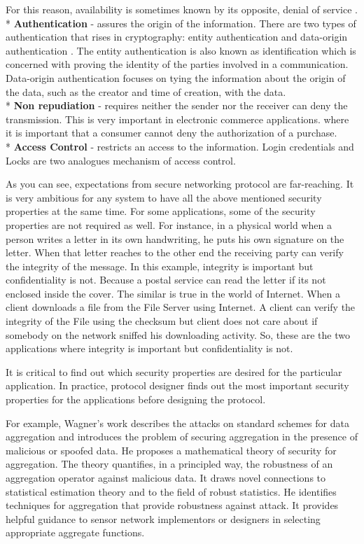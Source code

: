 	For this reason, availability is sometimes known by its opposite, denial of service \cite{pfleeger2002security}.
	\\*
	\textbf{Authentication} - assures the origin of the information.
	There are two types of authentication that rises in cryptography: entity authentication and data-origin authentication \cite{trappe2006introduction}.
	The entity authentication is also known as identification which is concerned with proving the identity of the parties involved in a communication.
	Data-origin authentication focuses on tying the information about the origin of the data, such as the creator and time of creation, with the data.\\*
	\textbf{Non repudiation} - requires neither the sender nor the receiver can deny the transmission.
	This is very important in electronic commerce applications. where it is important that a consumer cannot deny the authorization of a purchase.
	\\*
	\textbf{Access Control} - restricts an access to the information.
	Login credentials and Locks are two analogues mechanism of access control.

	As you can see, expectations from secure networking protocol are far-reaching.
	It is very ambitious for any system to have all the above mentioned security properties at the same time.
	For some applications, some of the security properties are not required as well.
	For instance, in a physical world when a person writes a letter in its own handwriting, he puts his own signature on the letter. 
	When that letter reaches to the other end the receiving party can verify the integrity of the message.
	In this example, integrity is important but confidentiality is not. Because a postal service can read the letter if its not enclosed inside the cover.
	The similar is true in the world of Internet.
	When a client downloads a file from the File Server using Internet.
	A client can verify the integrity of the File using the checksum but client does not care about if somebody on the network sniffed his downloading activity. 
	So, these are the two applications where integrity is important but confidentiality is not.
	
	It is critical to find out which security properties are desired for the particular application.
	In practice, protocol designer finds out the most important security properties for the applications before designing the protocol.

	For example, Wagner's work \cite{wagner2004resilient} describes the attacks on standard schemes for data aggregation and introduces the problem of securing aggregation in the presence of malicious or spoofed data.
	He proposes a mathematical theory of security for aggregation.
	The theory quantifies, in a principled way, the robustness of an aggregation operator against malicious data.
	It draws novel connections to statistical estimation theory and to the field of robust statistics.
	He identifies techniques for aggregation that provide robustness against attack. 
	It provides helpful guidance to sensor network implementors or designers in selecting appropriate aggregate functions.

